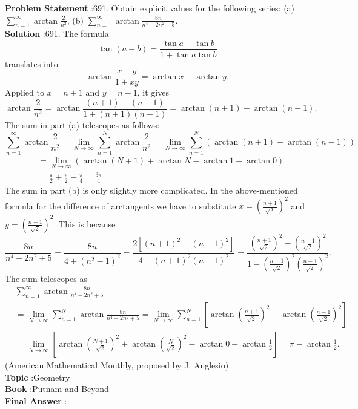 \documentclass[10pt]{article}
\begin{document}
\textbf{Problem Statement} :691. Obtain explicit values for the following series:
(a) $\sum_{n=1}^{\infty} \arctan \frac{2}{n^{2}}$,
(b) $\sum_{n=1}^{\infty} \arctan \frac{8 n}{n^{4}-2 n^{2}+5}$.\\
\textbf{Solution} :691. The formula$$ \tan (a-b)=\frac{\tan a-\tan b}{1+\tan a \tan b} $$translates into$$ \arctan \frac{x-y}{1+x y}=\arctan x-\arctan y . $$Applied to $x=n+1$ and $y=n-1$, it gives$$ \arctan \frac{2}{n^{2}}=\arctan \frac{(n+1)-(n-1)}{1+(n+1)(n-1)}=\arctan (n+1)-\arctan (n-1) . $$The sum in part (a) telescopes as follows:$$ \sum_{n=1}^{\infty} \arctan \frac{2}{n^{2}}=\lim _{N \rightarrow \infty} \sum_{n=1}^{N} \arctan \frac{2}{n^{2}}=\lim _{N \rightarrow \infty} \sum_{n=1}^{N}(\arctan (n+1)-\arctan (n-1)) $$$$ \begin{aligned} &=\lim _{N \rightarrow \infty}(\arctan (N+1)+\arctan N-\arctan 1-\arctan 0) \\ &=\frac{\pi}{2}+\frac{\pi}{2}-\frac{\pi}{4}=\frac{3 \pi}{4} \end{aligned} $$The sum in part (b) is only slightly more complicated. In the above-mentioned formula for the difference of arctangents we have to substitute $x=\left(\frac{n+1}{\sqrt{2}}\right)^{2}$ and $y=\left(\frac{n-1}{\sqrt{2}}\right)^{2}$. This is because$$ \frac{8 n}{n^{4}-2 n^{2}+5}=\frac{8 n}{4+\left(n^{2}-1\right)^{2}}=\frac{2\left[(n+1)^{2}-(n-1)^{2}\right]}{4-(n+1)^{2}(n-1)^{2}}=\frac{\left(\frac{n+1}{\sqrt{2}}\right)^{2}-\left(\frac{n-1}{\sqrt{2}}\right)^{2}}{1-\left(\frac{n+1}{\sqrt{2}}\right)^{2}\left(\frac{n-1}{\sqrt{2}}\right)^{2}} . $$The sum telescopes as$$ \begin{aligned} &\sum_{n=1}^{\infty} \arctan \frac{8 n}{n^{4}-2 n^{2}+5} \\ &=\lim _{N \rightarrow \infty} \sum_{n=1}^{N} \arctan \frac{8 n}{n^{4}-2 n^{2}+5}=\lim _{N \rightarrow \infty} \sum_{n=1}^{N}\left[\arctan \left(\frac{n+1}{\sqrt{2}}\right)^{2}-\arctan \left(\frac{n-1}{\sqrt{2}}\right)^{2}\right] \\ &=\lim _{N \rightarrow \infty}\left[\arctan \left(\frac{N+1}{\sqrt{2}}\right)^{2}+\arctan \left(\frac{N}{\sqrt{2}}\right)^{2}-\arctan 0-\arctan \frac{1}{2}\right]=\pi-\arctan \frac{1}{2} . \end{aligned} $$(American Mathematical Monthly, proposed by J. Anglesio)\\
\textbf{Topic} :Geometry\\
\textbf{Book} :Putnam and Beyond\\
\textbf{Final Answer} :\\
\end{document}
